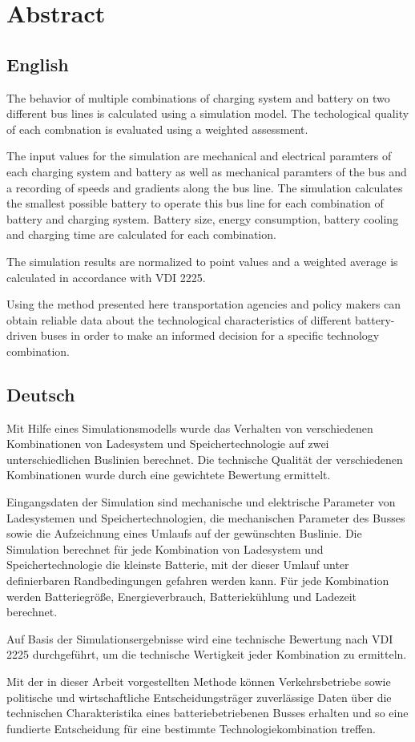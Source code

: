 \chapter*{Abstract}
\section*{English}
The behavior of multiple combinations of charging system and battery on two different bus lines is calculated using a simulation model. The techological quality of each combnation is evaluated using a weighted assessment.

The input values for the simulation are mechanical and electrical paramters of each charging system and battery as well as mechanical paramters of the bus and a recording of speeds and gradients along the bus line. The simulation calculates the smallest possible battery to operate this bus line for each combination of battery and charging system. Battery size, energy consumption, battery cooling and charging time are calculated for each combination.

The simulation results are normalized to point values and a weighted average is calculated in accordance with VDI 2225.

Using the method presented here transportation agencies and policy makers can obtain reliable data about the technological characteristics of different battery-driven buses in order to make an informed decision for a specific technology combination.

\section*{Deutsch}
Mit Hilfe eines Simulationsmodells wurde das Verhalten von verschiedenen Kombinationen von Ladesystem und Speichertechnologie auf zwei unterschiedlichen Buslinien berechnet. Die technische Qualität der verschiedenen Kombinationen wurde durch eine gewichtete Bewertung ermittelt.

Eingangsdaten der Simulation sind mechanische und elektrische Parameter von Ladesystemen und Speichertechnologien, die mechanischen Parameter des Busses sowie die Aufzeichnung eines Umlaufs auf der gewünschten Buslinie. Die Simulation berechnet für jede Kombination von Ladesystem und Speichertechnologie die kleinste Batterie, mit der dieser Umlauf unter definierbaren Randbedingungen gefahren werden kann. Für jede Kombination werden Batteriegröße, Energieverbrauch, Batteriekühlung und Ladezeit berechnet.

Auf Basis der Simulationsergebnisse wird eine technische Bewertung nach VDI 2225 durchgeführt, um die technische Wertigkeit jeder Kombination zu ermitteln.

Mit der in dieser Arbeit vorgestellten Methode können Verkehrsbetriebe sowie politische und wirtschaftliche Entscheidungsträger zuverlässige Daten über die technischen Charakteristika eines batteriebetriebenen Busses erhalten und so eine fundierte Entscheidung für eine bestimmte Technologiekombination treffen.